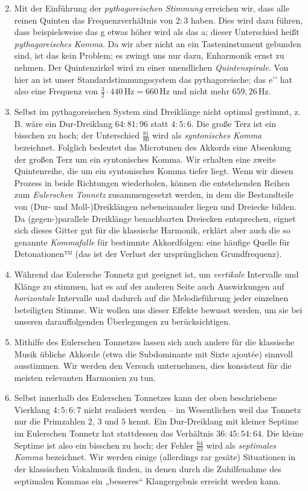 \begin{enumerate}
  \setcounter{enumi}{1}
\item Mit der Einführung der \emph{pythagoreischen Stimmung} erreichen wir, dass
  alle reinen Quinten das Frequenzverhältnis von $2:3$ haben. Dies wird dazu
  führen, dass beispielsweise das \sharp g etwas höher wird als das \flat a;
  dieser Unterschied heißt \emph{pythagoreisches Komma}. Da wir aber nicht an
  ein Tasteninstument gebunden sind, ist das kein Problem; es zwingt uns nur
  dazu, Enharmonik ernst zu nehmen. Der Quintenzirkel wird zu einer unendlichen
  \emph{Quintenspirale}.  Von hier an ist unser Standardstimmungssystem das
  pythagoreische; das e’’ hat also eine Frequenz von
  $\frac32\cdot 440\,\text{Hz}=660\,\text{Hz}$ und nicht mehr
  $659{,}26\,\text{Hz}$.
\item Selbst im pythagoreischen System sind Dreiklänge nicht optimal gestimmt,
  z.\,B. wäre ein Dur-Dreiklang $64:81:96$ statt $4:5:6$. Die große Terz ist ein
  bisschen zu hoch; der Unterschied $\frac{81}{80}$ wird als \emph{syntonisches
    Komma} bezeichnet. Folglich bedeutet das Microtunen des Akkords eine
  Absenkung der großen Terz um ein syntonisches Komma. Wir erhalten eine zweite
  Quintenreihe, die um ein syntonisches Komma tiefer liegt. Wenn wir diesen
  Prozess in beide Richtungen wiederholen, können die entstehenden Reihen zum
  \emph{Eulerschen Tonnetz} zusammengesetzt werden, in dem die Bestandteile von
  (Dur- und Moll-)Dreiklängen nebeneinander liegen und Dreiecke bilden. Da
  \mbox{(gegen-)}parallele Dreiklänge benachbarten Dreiecken entsprechen, eignet
  sich dieses Gitter gut für die klassische Harmonik, erklärt aber auch die so
  genannte \emph{Kommafalle} für bestimmte Akkordfolgen: eine häufige Quelle für
  Detonationen™ (das ist der Verlust der ursprünglichen Grundfrequenz).
\item Während das Eulersche Tonnetz gut geeignet ist, um \emph{vertikale}
  Intervalle und Klänge zu stimmen, hat es auf der anderen Seite auch
  Auswirkungen auf \emph{horizontale} Intervalle und dadurch auf die
  Melodieführung jeder einzelnen beteiligten Stimme.  Wir wollen uns dieser
  Effekte bewusst werden, um sie bei unseren darauffolgenden Überlegungen zu
  berücksichtigen.
\item Mithilfe des Eulerschen Tonnetzes lassen sich auch andere für die
  klassische Musik übliche Akkorde (etwa die Subdominante mit Sixte ajoutée)
  sinnvoll ausstimmen. Wir werden den Versuch unternehmen, dies konsistent für
  die meisten relevanten Harmonien zu tun.
\item Selbst innerhalb des Eulerschen Tonnetzes kann der oben beschriebene
  Vierklang $4:5:6:7$ nicht realisiert werden – im Wesentlichen weil das Tonnetz
  nur die Primzahlen $2$, $3$ und $5$ kennt. Ein Dur-Dreiklang mit kleiner
  Septime im Eulerschen Tonnetz hat stattdessen das Verhältnis $36:45:54:64$.
  Die kleine Septime ist also ein bisschen zu hoch; der Fehler $\frac{64}{63}$
  wird als \emph{septimales Komma} bezeichnet. Wir werden einige (allerdings rar
  gesäte) Situationen in der klassischen Vokalmusik finden, in denen durch die
  Zuhilfenahme des septimalen Kommas ein „besseres“ Klangergebnis erreicht
  werden kann.
\end{enumerate}

